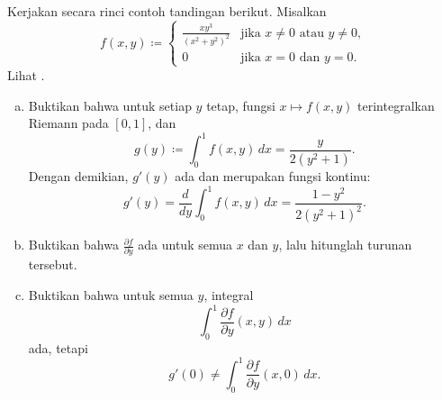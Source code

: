 \begin{myfigureht}
\caption{Grafik $z= \frac{xy^3}{{(x^2+y^2)}^2}$ pada
$[0,1] \times [0,1]$.\label{fig:diffunderex916}}
\end{myfigureht}

\begin{exercise}
\pagebreak[2]
Kerjakan secara rinci contoh tandingan berikut.  Misalkan
\begin{equation*}
f(x,y) \coloneqq
\begin{cases}
\frac{xy^3}{{(x^2+y^2)}^2} & \text{jika } x \neq 0 \text{ atau } y \neq 0, \\
0                          & \text{jika } x = 0 \text{ dan } y = 0.
\end{cases}
\end{equation*}
Lihat .
\begin{enumerate}[a)]
\item
Buktikan bahwa untuk setiap $y$ tetap, fungsi $x \mapsto f(x,y)$
terintegralkan Riemann pada $[0,1]$, dan
\begin{equation*}
g(y) \coloneqq \int_0^1 f(x,y) \, dx = \frac{y}{2(y^2+1)} .
\end{equation*}
Dengan demikian, $g'(y)$ ada dan merupakan fungsi kontinu:
\begin{equation*}
g'(y) =
\frac{d}{dy} \int_0^1 f(x,y) \, dx
=
\frac{1-y^2}{2{(y^2+1)}^2} .
\end{equation*}
\item
Buktikan bahwa $\frac{\partial f}{\partial y}$ ada untuk semua $x$ dan $y$, lalu
hitunglah turunan tersebut.
\item
Buktikan bahwa untuk semua $y$, integral
\begin{equation*}
\int_0^1 \frac{\partial f}{\partial y} (x,y) \, dx
\end{equation*}
ada, tetapi
\begin{equation*}
g'(0) \neq \int_0^1 \frac{\partial f}{\partial y} (x,0) \, dx .
\end{equation*}
\end{enumerate}
\end{exercise}

